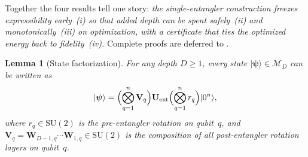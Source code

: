 \documentclass[11pt]{article}
\newcommand{\SU}{\mathrm{SU}}
\newcommand{\cM}{\mathcal{M}}
\newtheorem{lemma}[theorem]{Lemma}
\theoremstyle{plain}
\theoremstyle{plain}
\begin{document}
Together the four results tell one story: \emph{the single-entangler
construction freezes expressibility early~(i) so that added depth can be
spent safely~(ii) and monotonically~(iii) on optimization, with a
certificate that ties the optimized energy back to fidelity~(iv).}  Complete proofs are deferred
to .
\begin{lemma}[State factorization]\label{lem:factor}
  For any depth $D\ge 1$, every state
  $|\boldsymbol{\psi}\rangle\in\cM_D$ can be written as
  \begin{equation}\label{eq:state_form}
    |\boldsymbol{\psi}\rangle
    = \Bigl(\bigotimes_{q=1}^n \mathbf{V}_q\Bigr) 
      \mathbf{U}_{\mathrm{ent}} 
      \Bigl(\bigotimes_{q=1}^n r_q\Bigr)|0^n\rangle,
  \end{equation}
  where $r_q\in\SU(2)$ is the pre-entangler rotation on qubit~$q$, and
  $\mathbf{V}_q = \mathbf{W}_{D{-}1,q}\cdots \mathbf{W}_{1,q}\in\SU(2)$ is the composition of all
  post-entangler rotation layers on qubit~$q$.
\end{lemma}
\end{document}

